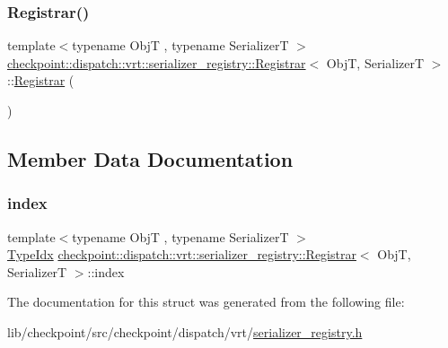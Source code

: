 \subsubsection{\texorpdfstring{Registrar()}{Registrar()}}
{\footnotesize\ttfamily template$<$typename ObjT , typename SerializerT $>$ \\
\hyperlink{structcheckpoint_1_1dispatch_1_1vrt_1_1serializer__registry_1_1_registrar}{checkpoint\+::dispatch\+::vrt\+::serializer\+\_\+registry\+::\+Registrar}$<$ ObjT, SerializerT $>$\+::\hyperlink{structcheckpoint_1_1dispatch_1_1vrt_1_1serializer__registry_1_1_registrar}{Registrar} (\begin{DoxyParamCaption}{ }\end{DoxyParamCaption})}



\subsection{Member Data Documentation}
\mbox{\label{structcheckpoint_1_1dispatch_1_1vrt_1_1serializer__registry_1_1_registrar_a1bd917516ca1cdcc553dd17bdf3c894f}} 
\subsubsection{\texorpdfstring{index}{index}}
{\footnotesize\ttfamily template$<$typename ObjT , typename SerializerT $>$ \\
\hyperlink{namespacecheckpoint_1_1dispatch_1_1vrt_acd3f9e6b091bcfbc23dc35ea8ef45d3b}{Type\+Idx} \hyperlink{structcheckpoint_1_1dispatch_1_1vrt_1_1serializer__registry_1_1_registrar}{checkpoint\+::dispatch\+::vrt\+::serializer\+\_\+registry\+::\+Registrar}$<$ ObjT, SerializerT $>$\+::index}



The documentation for this struct was generated from the following file\+:\begin{DoxyCompactItemize}
\item 
lib/checkpoint/src/checkpoint/dispatch/vrt/\hyperlink{serializer__registry_8h}{serializer\+\_\+registry.\+h}\end{DoxyCompactItemize}
